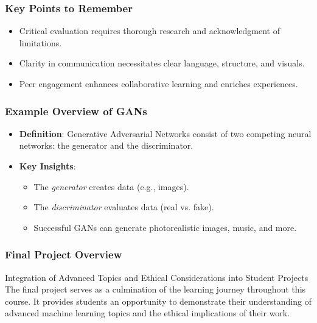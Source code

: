 \documentclass[aspectratio=169]{beamer}
\begin{document}
\begin{frame}[fragile]
    \frametitle{Key Points to Remember}
    \begin{itemize}
        \item Critical evaluation requires thorough research and acknowledgment of limitations.
        \item Clarity in communication necessitates clear language, structure, and visuals.
        \item Peer engagement enhances collaborative learning and enriches experiences.
    \end{itemize}
\end{frame}

\begin{frame}[fragile]
    \frametitle{Example Overview of GANs}
    \begin{itemize}
        \item \textbf{Definition}: Generative Adversarial Networks consist of two competing neural networks: the generator and the discriminator.
        
        \item \textbf{Key Insights}:
            \begin{itemize}
                \item The \textit{generator} creates data (e.g., images).
                \item The \textit{discriminator} evaluates data (real vs. fake).
                \item Successful GANs can generate photorealistic images, music, and more.
            \end{itemize}
    \end{itemize}
\end{frame}

\begin{frame}[fragile]
    \frametitle{Final Project Overview}
    \begin{block}{Integration of Advanced Topics and Ethical Considerations into Student Projects}
        The final project serves as a culmination of the learning journey throughout this course. It provides students an opportunity to demonstrate their understanding of advanced machine learning topics and the ethical implications of their work.
    \end{block}
\end{frame}
\end{document}
